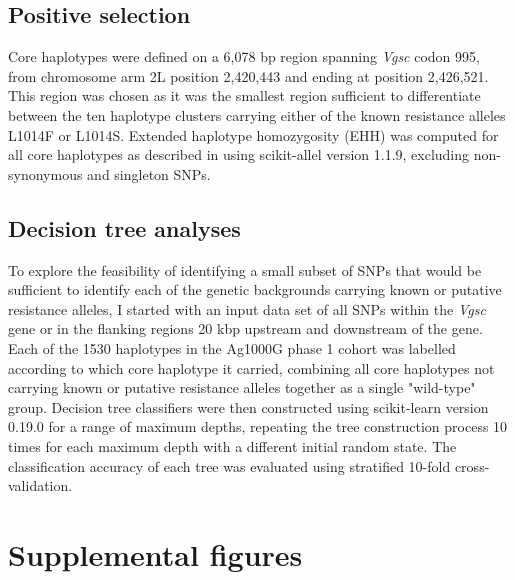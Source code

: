 \documentclass[a4paper,11pt,abstracton,hidelinks]{scrartcl}
\begin{document}
\subsection{Positive selection}\label{subsec:methods-selection}


Core haplotypes were defined on a 6,078 bp region spanning \textit{Vgsc} codon 995, from chromosome arm 2L position 2,420,443 and ending at position 2,426,521.
%
This region was chosen as it was the smallest region sufficient to differentiate between the ten haplotype clusters carrying either of the known resistance alleles L1014F or L1014S.
%
Extended haplotype homozygosity (EHH) was computed for all core haplotypes as described in \textcite{Sabeti2002} using scikit-allel version 1.1.9, excluding non-synonymous and singleton SNPs.


\subsection{Decision tree analyses}\label{subsec:methods-dts}


To explore the feasibility of identifying a small subset of SNPs that would be sufficient to identify each of the genetic backgrounds carrying known or putative resistance alleles, I started with an input data set of all SNPs within the \textit{Vgsc} gene or in the flanking regions 20 kbp upstream and downstream of the gene.
%
Each of the 1530 haplotypes in the Ag1000G phase 1 cohort was labelled according to which core haplotype it carried, combining all core haplotypes not carrying known or putative resistance alleles together as a single "wild-type" group.
%
Decision tree classifiers were then constructed using scikit-learn version 0.19.0 for a range of maximum depths, repeating the tree construction process 10 times for each maximum depth with a different initial random state.
%
The classification accuracy of each tree was evaluated using stratified 10-fold cross-validation.


\printbibliography


\clearpage
\beginsupplement
\section{Supplemental figures}\label{sec:supplemental-figures}
\end{document}
